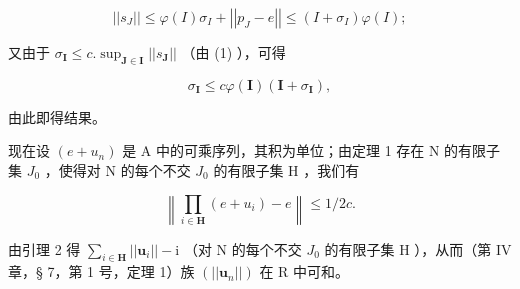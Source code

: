 \[
\left| \left| s _ {J} \right| \right| \leqslant \varphi (I) \sigma_ {I} + \left| \left| p _ {J} - e \right| \right| \leqslant (I + \sigma_ {I}) \varphi (I);
\]

又由于 \(\sigma_{\mathbf{I}} \leqslant c.\sup_{\mathbf{J} \in \mathbf{I}} ||s_{\mathbf{J}}||\) （由 (1) ），可得

\[
\sigma_ {\mathbf {I}} \leqslant c \varphi (\mathbf {I}) (\mathbf {I} + \sigma_ {\mathbf {I}}),
\]

由此即得结果。

现在设 \((e + u_{n})\) 是 A 中的可乘序列，其积为单位；由定理 1 存在 N 的有限子集 \(J_{0}\) ，使得对 N 的每个不交 \(J_{0}\) 的有限子集 H ，我们有

\[
\left\| \prod_ {i \in \mathbf {H}} (e + u _ {i}) - e \right\| \leqslant 1 / 2 c.
\]

由引理 2 得 \(\sum_{i\in\mathbf{H}}||\boldsymbol{u}_{i}||-\mathrm{i}\) （对 N 的每个不交 \(J_{0}\) 的有限子集 H ），从而（第 IV 章，§ 7，第 1 号，定理 1）族 \((||\boldsymbol{u}_{n}||)\) 在 R 中可和。

